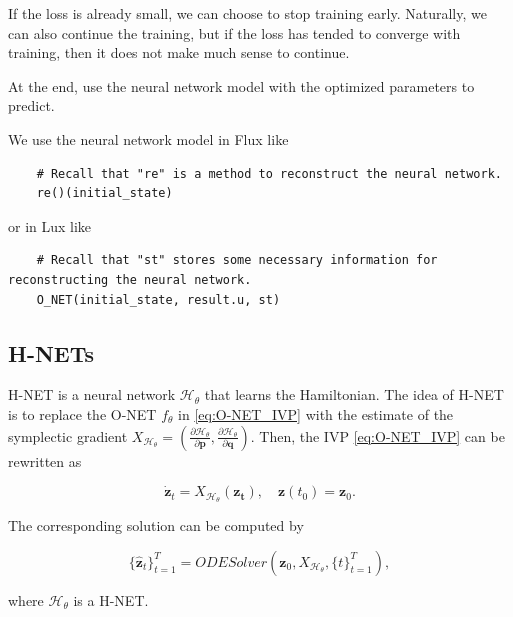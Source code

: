 \documentclass[
	parskip, 			   %
	twoside, 			   %
	DIV=14, 			   %
	BCOR=15.0mm, 		   %
	headsepline, 		   %
	open=right, 		   %
	captions=tableheading, %
	bibliography=totoc,    %
	numbers=noenddot       %
]{scrreprt}
\begin{document}
If the loss is already small, we can choose to stop training early. Naturally, we can also continue the training, but if the loss has tended to converge with training, then it does not make much sense to continue.

At the end, use the neural network model with the optimized parameters to predict.

We use the neural network model in Flux like
\begin{verbatim}
    # Recall that "re" is a method to reconstruct the neural network.
    re()(initial_state)
\end{verbatim}

or in Lux like
\begin{verbatim}
    # Recall that "st" stores some necessary information for reconstructing the neural network.
    O_NET(initial_state, result.u, st)
\end{verbatim}


\subsection{H-NETs}
H-NET is a neural network $\mathcal{H}_{\theta}$ that learns the Hamiltonian. The idea of H-NET is to replace the O-NET $f_{\theta}$ in \ref{eq:O-NET_IVP} with the estimate of the symplectic gradient $X_{\mathcal{H}_{\theta}}=(\frac{\partial \mathcal{H}_{\theta}}{\partial \mathbf{p}}, \frac{\partial \mathcal{H}_{\theta}}{\partial \mathbf{q}})$. Then, the IVP \ref{eq:O-NET_IVP} can be rewritten as

\begin{equation}
    \label{eq:H-NET_IVP}
    \dot{\mathbf{z}}_t = X_{\mathcal{H}_{\theta}}(\mathbf{z_t}), \quad \mathbf{z}(t_{0}) = \mathbf{z}_{0}.
\end{equation}

The corresponding solution can be computed by

\begin{equation}
    \label{eq:H-NET_ODESolver}
     \{ \mathbf{\hat{z}}_{t} \}_{t=1}^{T}  = ODESolver(\mathbf{z}_{0}, X_{\mathcal{H}_{\theta}}, \{ t \}_{t=1}^{T}),
\end{equation}

where $\mathcal{H}_{\theta}$ is a H-NET.
\end{document}
